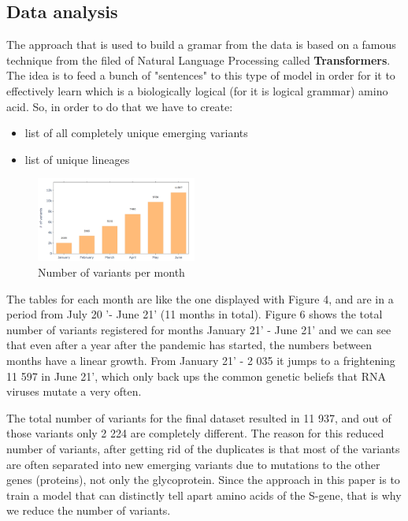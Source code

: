 \documentclass[conference,compsoc]{IEEEtran}
\begin{document}
\subsection{Data analysis}
The approach that is used to build a gramar from the data is based on a famous technique from the filed of Natural Language Processing called \textbf{Transformers}. \cite{ref16} The idea is to feed a bunch of "sentences" to this type of model in order for it to effectively learn which is a biologically logical (for it is logical grammar) amino acid. So, in order to do that we have to create:
\begin{itemize}
    \item list of all completely unique emerging variants
    \item list of unique lineages
\end{itemize}

\begin{figure}[h]
    \centering
    \includegraphics[width=0.47\textwidth]{images/fig5-number-variants.png}
    \caption{Number of variants per month}
    \label{fig5}
\end{figure}

The tables for each month are like the one displayed with Figure 4, and are in a period from July 20 '- June 21' (11 months in total). Figure 6 shows the total number of variants registered for months January 21' - June 21' and we can see that even after a year after the pandemic has started, the numbers between months have a linear growth. From January 21' - 2 035 it jumps to a frightening 11 597 in June 21', which only back ups the common genetic beliefs \cite{ref17} that RNA viruses mutate a very often. 

The total number of variants for the final dataset resulted in 11 937, and out of those variants only 2 224 are completely different. The reason for this reduced number of variants, after getting rid of the duplicates is that most of the variants are often separated into new emerging variants due to mutations to the other genes (proteins), not only the glycoprotein. Since the approach in this paper is to train a model that can distinctly tell apart amino acids of the S-gene, that is why we reduce the number of variants. 
\end{document}
